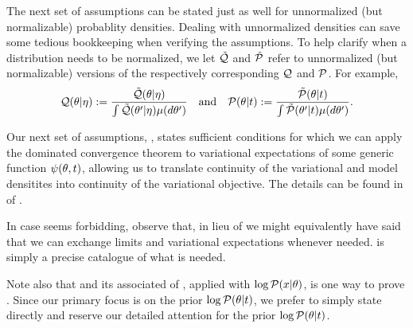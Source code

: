 The next set of assumptions can be stated just as well for unnormalized (but
normalizable) probablity densities.  Dealing with unnormalized densities can
save some tedious bookkeeping when verifying the assumptions.  To help clarify
when a distribution needs to be normalized, we let $\tilde{\mathcal{Q}}$ and $\tilde{\mathcal{P}}$ refer to
unnormalized (but normalizable) versions of the respectively corresponding $\mathcal{Q}$
and $\mathcal{P}$.  For example,
%
\begin{align*}
%
\q(\theta \vert \eta) :={}
    \frac{\qtil(\theta \vert \eta)}
    {\int \qtil(\theta' \vert \eta) \mu(d\theta')} \mathand
\p(\theta \vert \t) :={}
    \frac{\ptil(\theta \vert \t)}
    {\int \ptil(\theta' \vert \t) \mu(d\theta')}.
%
\end{align*}
%


Our next set of assumptions, , states sufficient
conditions for which we can apply the dominated convergence theorem to
variational expectations of some generic function $\psi(\theta, t)$, allowing
us to translate continuity of the variational and model densitites into
continuity of the variational objective.  The details can be found in
 of .

In case  seems forbidding, observe that, in lieu of
 we might equivalently have said that we can exchange
limits and variational expectations whenever needed.   is
simply a precise catalogue of what is needed.

Note also that  and its associated  of , applied with $\log \mathcal{P}(x \vert \theta)$,
is one way to prove .  Since our primary
focus is on the prior $\log \mathcal{P}(\theta \vert t)$, we prefer to simply state
 directly and reserve our detailed attention
for the prior $\log \mathcal{P}(\theta \vert t)$.


